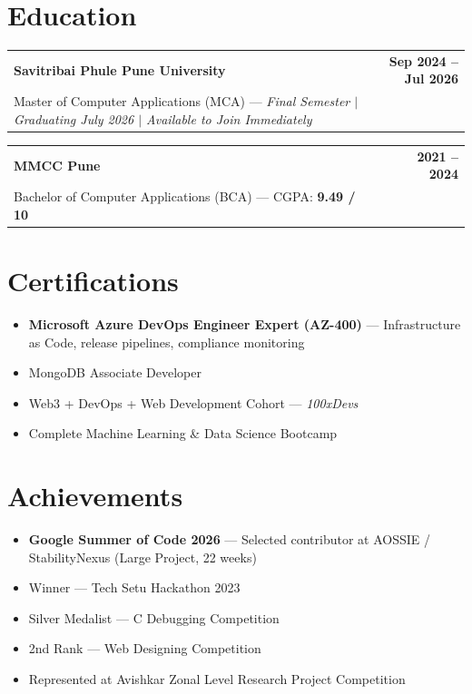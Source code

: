 \documentclass[a4paper,10pt]{article}
\begin{document}
\section{Education}

\begin{tabularx}{\linewidth}{@{}X r@{}}
\textbf{Savitribai Phule Pune University} & \textbf{Sep 2024 -- Jul 2026} \\
Master of Computer Applications (MCA) --- \textit{Final Semester $|$ Graduating July 2026 $|$ Available to Join Immediately}
\end{tabularx}

\vspace{4pt}
\begin{tabularx}{\linewidth}{@{}X r@{}}
\textbf{MMCC Pune} & \textbf{2021 -- 2024} \\
Bachelor of Computer Applications (BCA) --- CGPA: \textbf{9.49 / 10}
\end{tabularx}

\section{Certifications}

\begin{itemize}
\item \textbf{Microsoft Azure DevOps Engineer Expert (AZ-400)} --- Infrastructure as Code, release pipelines, compliance monitoring
\item MongoDB Associate Developer
\item Web3 + DevOps + Web Development Cohort --- \textit{100xDevs}
\item Complete Machine Learning \& Data Science Bootcamp
\end{itemize}

\section{Achievements}

\begin{itemize}
\item \textbf{Google Summer of Code 2026} --- Selected contributor at AOSSIE / StabilityNexus (Large Project, 22 weeks)
\item Winner --- Tech Setu Hackathon 2023
\item Silver Medalist --- C Debugging Competition
\item 2nd Rank --- Web Designing Competition
\item Represented at Avishkar Zonal Level Research Project Competition
\end{itemize}
\end{document}
